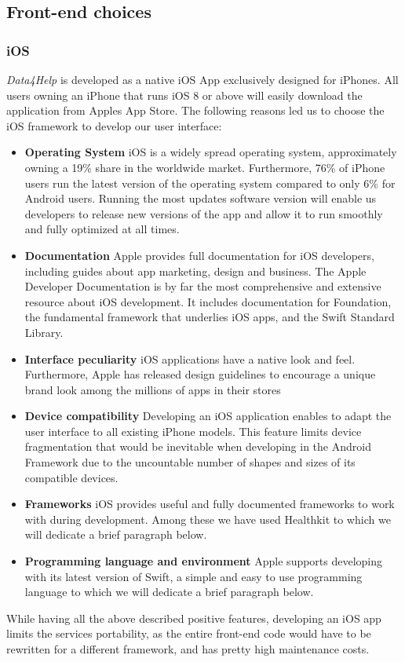 \documentclass[titlepage]{article}
\begin{document}
	
	
	\subsection{Front-end choices}
	
	\subsubsection{iOS}
	{\it Data4Help} is developed as a native iOS App exclusively designed for iPhones. All users owning an iPhone that runs iOS 8 or above will easily download the application from Apple\textsc{}s App Store. The following reasons led us to choose the iOS framework to develop our user interface:
	\begin{itemize}
		\item {\bf Operating System}
		iOS is a widely spread operating system, approximately owning a 19\% share in the worldwide market. Furthermore, 76\% of iPhone users run the latest version of the operating system compared to only 6\% for Android users. Running the most updates software version will enable us developers to release new versions of the app and allow it to run smoothly and fully optimized at all times.
		\item {\bf Documentation}
		Apple provides full documentation for iOS developers, including guides about app marketing, design and business. The Apple Developer Documentation is by far the most comprehensive and extensive resource about iOS development. It includes documentation for Foundation, the fundamental framework that underlies iOS apps, and the Swift Standard Library.
		\item {\bf Interface peculiarity}
		iOS applications have a native look and feel. Furthermore, Apple has released design guidelines to encourage a unique brand look among the millions of apps in their stores
		\item {\bf Device compatibility}
		Developing an iOS application enables to adapt the user interface to all existing iPhone models. This feature limits device fragmentation that would be inevitable when developing in the Android Framework due to the uncountable number of shapes and sizes of its compatible devices.
		\item {\bf Frameworks}
		iOS provides useful and fully documented frameworks to work with during development. Among these we have used Healthkit to which we will dedicate a brief paragraph below.
		\item {\bf Programming language and environment}
		Apple supports developing with its latest version of Swift, a simple and easy to use programming language to which we will dedicate a brief paragraph below.
	\end{itemize}
	While having all the above described positive features, developing an iOS app limits the service\textsc{}s portability, as the entire front-end code would have to be rewritten for a different framework, and has pretty high maintenance costs.
	
\end{document}

